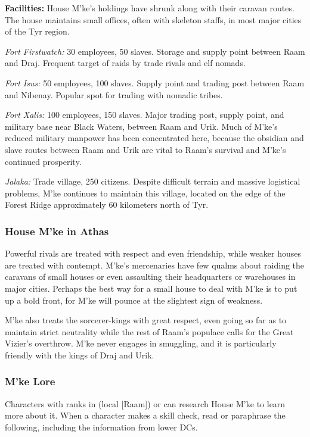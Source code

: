 \textbf{Facilities:} House M'ke's holdings have shrunk along with their caravan routes. The house maintains small offices, often with skeleton staffs, in most major cities of the Tyr region.

\textit{Fort Firstwatch:} 30 employees, 50 slaves. Storage and supply point between Raam and Draj. Frequent target of raids by trade rivals and elf nomads.

\textit{Fort Isus:} 50 employees, 100 slaves. Supply point and trading post between Raam and Nibenay. Popular spot for trading with nomadic tribes.

\textit{Fort Xalis:} 100 employees, 150 slaves. Major trading post, supply point, and military base near Black Waters, between Raam and Urik. Much of M'ke's reduced military manpower has been concentrated here, because the obsidian and slave routes between Raam and Urik are vital to Raam's survival and M'ke's continued prosperity.

\textit{Jalaka:} Trade village, 250 citizens. Despite difficult terrain and massive logistical problems, M'ke continues to maintain this village, located on the edge of the Forest Ridge approximately 60 kilometers north of Tyr.

\subsubsection{House M'ke in Athas}
Powerful rivals are treated with respect and even friendship, while weaker houses are treated with contempt. M'ke's mercenaries have few qualms about raiding the caravans of small houses or even assaulting their headquarters or warehouses in major cities. Perhaps the best way for a small house to deal with M'ke is to put up a bold front, for M'ke will pounce at the slightest sign of weakness.

M'ke also treats the sorcerer-kings with great respect, even going so far as to maintain strict neutrality while the rest of Raam's populace calls for the Great Vizier's overthrow. M'ke never engages in smuggling, and it is particularly friendly with the kings of Draj and Urik.

\subsubsection{M'ke Lore}
Characters with ranks in  (local [Raam]) or  can research House M'ke to learn more about it. When a character makes a skill check, read or paraphrase the following, including the information from lower DCs.


